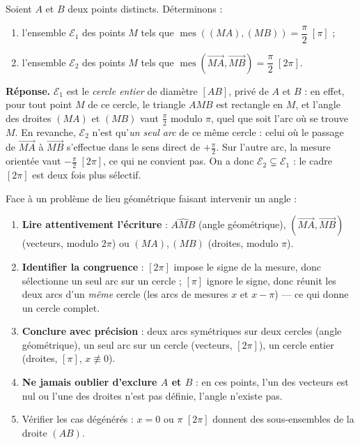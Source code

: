 \documentclass[11pt]{article}
\begin{document}
\begin{exemplebox}
Soient $A$ et $B$ deux points distincts. Déterminons :
\begin{enumerate}
\item l'ensemble $\mathcal{E}_1$ des points $M$ tels que $\operatorname{mes}((MA),(MB)) = \dfrac{\pi}{2} \;[\pi]$ ;
\item l'ensemble $\mathcal{E}_2$ des points $M$ tels que $\operatorname{mes}(\overrightarrow{MA},\overrightarrow{MB}) = \dfrac{\pi}{2} \;[2\pi]$.
\end{enumerate}
\textbf{Réponse.} $\mathcal{E}_1$ est le \emph{cercle entier} de diamètre $[AB]$, privé de $A$ et $B$ : en effet, pour tout point $M$ de ce cercle, le triangle $AMB$ est rectangle en $M$, et l'angle des droites $(MA)$ et $(MB)$ vaut $\frac{\pi}{2}$ modulo $\pi$, quel que soit l'arc où se trouve $M$. En revanche, $\mathcal{E}_2$ n'est qu'\emph{un seul arc} de ce même cercle : celui où le passage de $\overrightarrow{MA}$ à $\overrightarrow{MB}$ s'effectue dans le sens direct de $+\frac{\pi}{2}$. Sur l'autre arc, la mesure orientée vaut $-\frac{\pi}{2} \;[2\pi]$, ce qui ne convient pas. On a donc $\mathcal{E}_2 \subsetneq \mathcal{E}_1$ : le cadre $[2\pi]$ est deux fois plus sélectif.
\end{exemplebox}

\begin{methode}
Face à un problème de lieu géométrique faisant intervenir un angle :
\begin{enumerate}
\item \textbf{Lire attentivement l'écriture} : $\widehat{AMB}$ (angle géométrique), $(\overrightarrow{MA},\overrightarrow{MB})$ (vecteurs, modulo $2\pi$) ou $(MA),(MB)$ (droites, modulo $\pi$).
\item \textbf{Identifier la congruence} : $[2\pi]$ impose le signe de la mesure, donc sélectionne un seul arc sur un cercle ; $[\pi]$ ignore le signe, donc réunit les deux arcs d'un \emph{même} cercle (les arcs de mesures $x$ et $x-\pi$) — ce qui donne un cercle complet.
\item \textbf{Conclure avec précision} : deux arcs symétriques sur deux cercles (angle géométrique), un seul arc sur un cercle (vecteurs, $[2\pi]$), un cercle entier (droites, $[\pi]$, $x \not\equiv 0$).
\item \textbf{Ne jamais oublier d'exclure $A$ et $B$} : en ces points, l'un des vecteurs est nul ou l'une des droites n'est pas définie, l'angle n'existe pas.
\item Vérifier les cas dégénérés : $x = 0$ ou $\pi$ $[2\pi]$ donnent des sous-ensembles de la droite $(AB)$.
\end{enumerate}
\end{methode}
\end{document}
